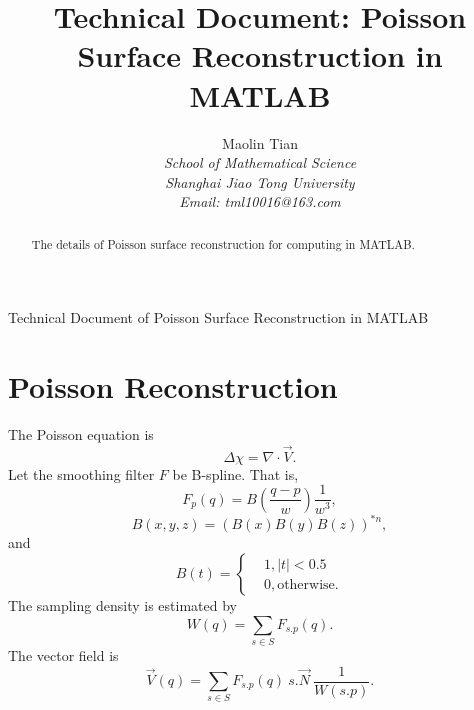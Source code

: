 \documentclass[11pt,twoside]{article}
\begin{document}
\cleardoublepage \pagestyle{myheadings}



\title{\bf Technical Document: Poisson Surface Reconstruction in MATLAB}


\author{Maolin Tian\\
{\it School of Mathematical Science}\\
{\it Shanghai Jiao Tong University}\\
{\it Email: tml10016@163.com }\\[2mm]
}

\maketitle {}
{\small  Technical Document of Poisson Surface Reconstruction in MATLAB }

\begin{abstract}
The details of Poisson surface reconstruction for computing in MATLAB.
\end{abstract}

\bigskip

\section{Poisson Reconstruction}\label{PR-sec}
The Poisson equation \cite{PR} is 
\begin{equation}\label{dbXV}
\Delta \chi  = \nabla \cdot \vec{V}.
\end{equation}
Let the smoothing filter \(F\) be B-spline. 
That is,
\begin{equation}\label{FFs}
F_p (q) = B(\frac{q-p}{w}) \frac{1}{w^3},
\end{equation}
\begin{equation}\label{BBBB}
B(x,y,z) = (B(x)B(y)B(z))^{*n},
\end{equation}
and
\begin{equation}\label{Bt10}
B(t) = \left\{
\begin{aligned}
& 1 , |t| < 0.5 \\
& 0 , \text{otherwise}.
\end{aligned}
\right.
\end{equation}
The sampling density is estimated by
\begin{equation}\label{sampling_density}
W (q) = \sum_{s \in S} F_{s.p} (q).
\end{equation}
The vector field is 
\begin{equation}\label{dXFN_discrete}
\vec{V}(q) = \sum_{s \in S}  F_{s.p} (q) \  s.\vec{N} \  \frac{1}{W(s.p)}.
\end{equation}
\end{document}
